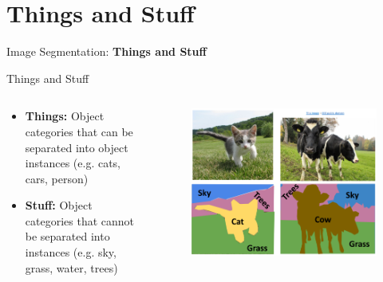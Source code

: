 \section{Things and Stuff}
\begin{frame}{}
    \LARGE Image Segmentation: \textbf{Things and Stuff}
\end{frame}

\begin{frame}{Things and Stuff}
\begin{columns}
    \begin{column}{0.5\textwidth}
        \begin{itemize}
            \item \textbf{Things:} Object categories that can be separated into object instances (e.g. cats, cars, person)
            \item \textbf{Stuff:} Object categories that cannot be separated into instances (e.g. sky, grass, water, trees)
        \end{itemize}
    \end{column}
    \begin{column}{0.5\textwidth}
        \begin{figure}
        \centering
        \includegraphics[width=1.0\textwidth,height=1.0\textheight,keepaspectratio]{images/segmentation/ins_1.png}
        \end{figure}
    \end{column}
\end{columns}
    
\end{frame}

